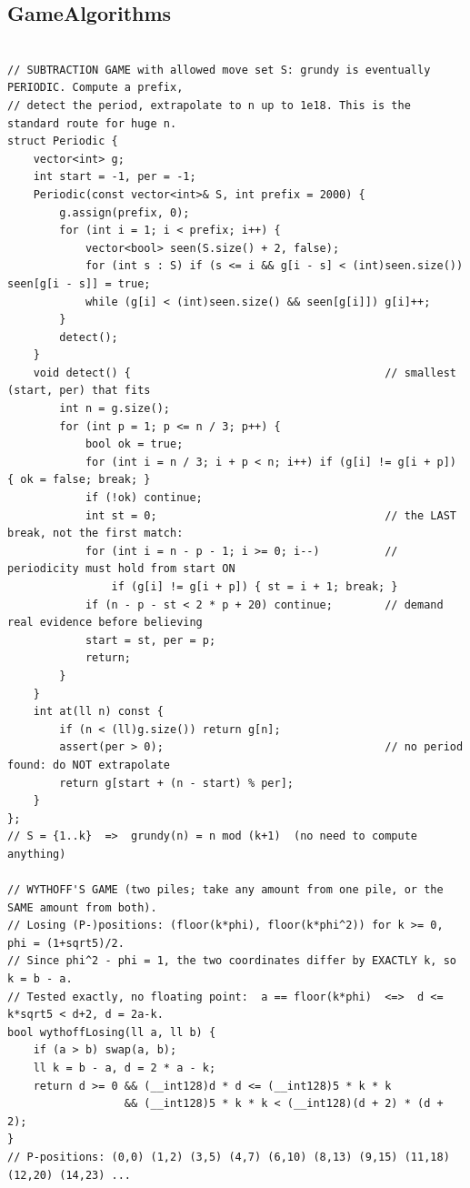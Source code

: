 \documentclass[9pt,a4paper,twocolumn]{extarticle}
\begin{document}
\subsection{GameAlgorithms}
\nopagebreak
\begin{lstlisting}

// SUBTRACTION GAME with allowed move set S: grundy is eventually PERIODIC. Compute a prefix,
// detect the period, extrapolate to n up to 1e18. This is the standard route for huge n.
struct Periodic {
    vector<int> g;
    int start = -1, per = -1;
    Periodic(const vector<int>& S, int prefix = 2000) {
        g.assign(prefix, 0);
        for (int i = 1; i < prefix; i++) {
            vector<bool> seen(S.size() + 2, false);
            for (int s : S) if (s <= i && g[i - s] < (int)seen.size()) seen[g[i - s]] = true;
            while (g[i] < (int)seen.size() && seen[g[i]]) g[i]++;
        }
        detect();
    }
    void detect() {                                       // smallest (start, per) that fits
        int n = g.size();
        for (int p = 1; p <= n / 3; p++) {
            bool ok = true;
            for (int i = n / 3; i + p < n; i++) if (g[i] != g[i + p]) { ok = false; break; }
            if (!ok) continue;
            int st = 0;                                   // the LAST break, not the first match:
            for (int i = n - p - 1; i >= 0; i--)          // periodicity must hold from start ON
                if (g[i] != g[i + p]) { st = i + 1; break; }
            if (n - p - st < 2 * p + 20) continue;        // demand real evidence before believing
            start = st, per = p;
            return;
        }
    }
    int at(ll n) const {
        if (n < (ll)g.size()) return g[n];
        assert(per > 0);                                  // no period found: do NOT extrapolate
        return g[start + (n - start) % per];
    }
};
// S = {1..k}  =>  grundy(n) = n mod (k+1)  (no need to compute anything)

// WYTHOFF'S GAME (two piles; take any amount from one pile, or the SAME amount from both).
// Losing (P-)positions: (floor(k*phi), floor(k*phi^2)) for k >= 0, phi = (1+sqrt5)/2.
// Since phi^2 - phi = 1, the two coordinates differ by EXACTLY k, so k = b - a.
// Tested exactly, no floating point:  a == floor(k*phi)  <=>  d <= k*sqrt5 < d+2, d = 2a-k.
bool wythoffLosing(ll a, ll b) {
    if (a > b) swap(a, b);
    ll k = b - a, d = 2 * a - k;
    return d >= 0 && (__int128)d * d <= (__int128)5 * k * k
                  && (__int128)5 * k * k < (__int128)(d + 2) * (d + 2);
}
// P-positions: (0,0) (1,2) (3,5) (4,7) (6,10) (8,13) (9,15) (11,18) (12,20) (14,23) ...


\end{lstlisting}
\end{document}
